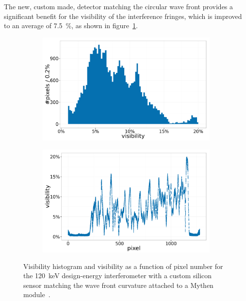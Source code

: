 The new, custom made, detector matching the circular wave front provides a
significant benefit for the visibility of the interference fringes, which is
improved to an average of \SI{7.5}{\percent}, as shown in
figure~\ref{fig:mythen-visibility}.

\begin{figure}[htb]
    \centering
    \begin{subfigure}[b]{.49\textwidth}
    \centering
    \includegraphics[width=\textwidth]{gfx/mythen-edge-on/visibility.png}
    \caption{}
    \label{fig:mythen-visibility}
    \end{subfigure}
    \hfill
    \begin{subfigure}[b]{.49\textwidth}
    \centering
    \includegraphics[width=\textwidth]{gfx/mythen-edge-on/pixel_visibility.png}
    \caption{}
    \label{fig:mythen-visibility-pixel}
    \end{subfigure}
    \caption[Visibility of the edge-on grating interferometer with a custom
    detector.]{Visibility histogram and visibility as a function of pixel
        number for the \SI{120}{\kilo\eV} design-energy interferometer with
        a custom silicon sensor matching the wave front curvature attached
        to a Mythen module~\cite{SCHMITT2003267}.
    }
\end{figure}

